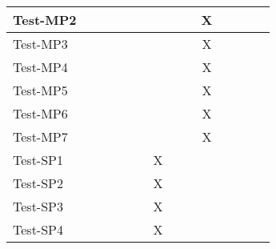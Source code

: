 \documentclass[12pt, titlepage]{article}
\begin{document}
\begin{table}[H]
\begin{adjustwidth}{-0.3in}{-0.5in}
{\begin{tabular}{c|c|c|c|c|c|c|c|c|c|c|c|c|c|}
\multicolumn{1}{|l|}{{Test-MP2}}   &             &             &            &             &             &             &             &             &         X    &                           &             &  &                    \\ \hline
\multicolumn{1}{|l|}{{Test-MP3}}   &             &             &             &             &             &             &             &             &          X    &                           &             &  &                    \\ \hline
\multicolumn{1}{|l|}{{Test-MP4}}   &             &             &             &             &             &             &             &             &           X   &                           &             &  &                    \\ \hline
\multicolumn{1}{|l|}{{Test-MP5}}   &             &             &             &             &             &             &             &             &          X    &                           &             &  &                    \\ \hline
\multicolumn{1}{|l|}{{Test-MP6}}   &             &             &             &             &                          &             &             &             &    X         &              &             &  &                    \\ \hline
\multicolumn{1}{|l|}{{Test-MP7}}   &             &             &             &             &             &             &             &             &         X                  &              &             &  &                    \\ \hline
\multicolumn{1}{|l|}{{Test-SP1}}   &             &             &             &             &             &        X     &             &             &              &                           &             &  &                    \\ \hline
\multicolumn{1}{|l|}{{Test-SP2}}   &             &             &             &             &             &       X      &             &             &              &                          &             &  &                    \\ \hline
\multicolumn{1}{|l|}{{Test-SP3}}   &             &             &             &             &             &        X     &             &             &              &                          &             &  &                    \\ \hline
\multicolumn{1}{|l|}{{Test-SP4}}   &             &             &             &             &             &         X    &             &             &              &            &                           &  &                    \\ \hline

\end{tabular}}
\end{adjustwidth}
\end{table}
\end{document}
